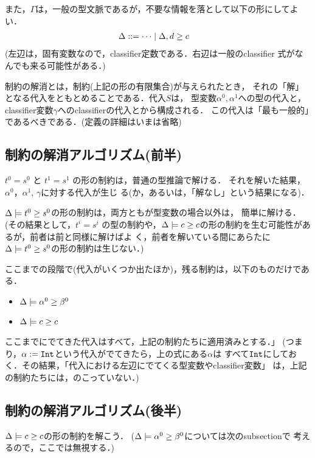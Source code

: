\documentclass[dvipdfmx]{jsarticle}
\newcommand\longer[2]{{#1} \ord {#2}}
\newcommand\Int{\mbox{\texttt{Int}}}
\begin{document}
また，$\Gamma$は，一般の型文脈であるが，不要な情報を落として以下の形にしてよい．
\begin{align*}
  \Delta & ::= \cdots \mid \Delta,\longer{d}{c}
\end{align*}
(左辺は，固有変数なので，classifier定数である．右辺は一般のclassifier
式がなんでも来る可能性がある．)

制約の解消とは，制約(上記の形の有限集合)が与えられたとき，
それの「解」となる代入をともとめることである．代入$S$は，
型変数$\alpha^0, \alpha^1$への型の代入と，
classifier変数$\gamma$へのclassifierの代入とから構成される．
この代入は「最も一般的」であるべきである．(定義の詳細はいまは省略)

\subsection{制約の解消アルゴリズム(前半)}

$t^0=s^0$ と $t^1=s^1$ の形の制約は，普通の型推論で解ける．
それを解いた結果，$\alpha^0$，$\alpha^1$, $\gamma$に対する代入が生じ
る(か，あるいは，「解なし」という結果になる)．

$\Delta \models \longer{t^0}{s^0}$の形の制約は，両方ともが型変数の場合以外は，
簡単に解ける．(その結果として，$t^i=s^i$ の型の制約や，$\Delta \models
\longer{c}{c}$の形の制約を生む可能性があるが，前者は前と同様に解けばよ
く，前者を解いている間にあらたに$\Delta \models \longer{t^0}{s^0}$の形の制約は生じない．)

ここまでの段階で(代入がいくつか出たほか)，残る制約は，以下のものだけである．

\begin{itemize}
\item $\Delta \models \longer{\alpha^0}{\beta^0}$
\item $\Delta \models \longer{c}{c}$
\end{itemize}

ここまでにでてきた代入はすべて，上記の制約たちに適用済みとする．」
(つまり，$\alpha:=\Int$という代入がでてきたら，上の式にある$\alpha$は
すべて$\Int$にしておく．その結果，「代入における左辺にでてくる型変数やclassifier変数」
は，上記の制約たちには，のこっていない．)


\subsection{制約の解消アルゴリズム(後半)}

$\Delta \models \longer{c}{c}$の形の制約を解こう．
($\Delta \models \longer{\alpha^0}{\beta^0}$については次のsubsectionで
考えるので，ここでは無視する．)
\end{document}
